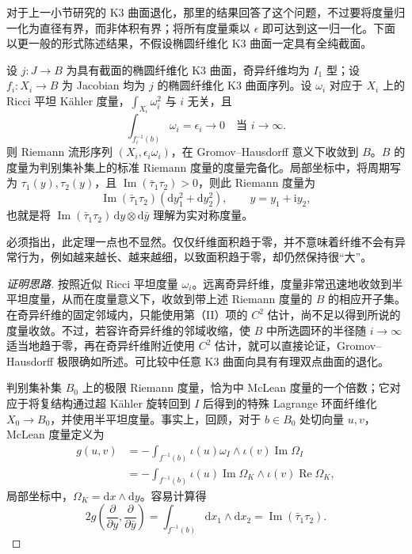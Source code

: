 对于上一小节研究的 K3 曲面退化，那里的结果回答了这个问题，不过要将度量归一化为直径有界，而非体积有界；将所有度量乘以 $\epsilon$ 即可达到这一归一化。下面以更一般的形式陈述结果，不假设椭圆纤维化 K3 曲面一定具有全纯截面。

\begin{theorem}\label{thm:7.31}
设 $j\colon J\to B$ 为具有截面的椭圆纤维化 K3 曲面，奇异纤维均为 $I_1$ 型；设 $f_i\colon X_i\to B$ 为 Jacobian 均为 $j$ 的椭圆纤维化 K3 曲面序列。设 $\omega_i$ 对应于 $X_i$ 上的 Ricci 平坦 Kähler 度量，$\int_{X_i}\omega_i^2$ 与 $i$ 无关，且
\[
\int_{f_i^{-1}(b)}\omega_i=\epsilon_i\longrightarrow0
\quad\text{当 }i\to\infty.
\]
则 Riemann 流形序列 $(X_i,\epsilon_i\omega_i)$，在 Gromov--Hausdorff 意义下收敛到 $B$。$B$ 的度量为判别集补集上的标准 Riemann 度量的度量完备化。局部坐标中，将周期写为 $\tau_1(y),\tau_2(y)$，且 $\operatorname{Im}(\bar\tau_1\tau_2)>0$，则此 Riemann 度量为
\[
\operatorname{Im}(\bar\tau_1\tau_2)
(\mathrm dy_1^2+\mathrm dy_2^2),\qquad y=y_1+\mathrm i y_2,
\]
也就是将 $\operatorname{Im}(\bar\tau_1\tau_2)\,\mathrm dy\otimes\mathrm d\bar y$ 理解为实对称度量。
\end{theorem}

必须指出，此定理一点也不显然。仅仅纤维面积趋于零，并不意味着纤维不会有异常行为，例如越来越长、越来越细，以致面积趋于零，却仍然保持很“大”。

\begin{proof}[证明思路]
按照近似 Ricci 平坦度量 $\omega_i$。远离奇异纤维，度量非常迅速地收敛到半平坦度量，从而在度量意义下，收敛到带上述 Riemann 度量的 $B$ 的相应开子集。在奇异纤维的固定邻域内，只能使用第（II）项的 $C^2$ 估计，尚不足以得到所说的度量收敛。不过，若容许奇异纤维的邻域收缩，使 $B$ 中所选圆环的半径随 $i\to\infty$ 适当地趋于零，再在奇异纤维附近使用 $C^2$ 估计，就可以直接论证，Gromov--Hausdorff 极限确如所述。可比较中任意 K3 曲面向具有有理双点曲面的退化。

判别集补集 $B_0$ 上的极限 Riemann 度量，恰为中 McLean 度量的一个倍数；它对应于将复结构通过超 Kähler 旋转回到 $I$ 后得到的特殊 Lagrange 环面纤维化 $X_0\to B_0$，并使用半平坦度量。事实上，回顾，对于 $b\in B_0$ 处切向量 $u,v$，McLean 度量定义为
\[
\begin{aligned}
g(u,v)
&=-\int_{f^{-1}(b)}\iota(u)\omega_I\wedge\iota(v)\operatorname{Im}\Omega_I\\
&=-\int_{f^{-1}(b)}\iota(u)\operatorname{Im}\Omega_K
\wedge\iota(v)\operatorname{Re}\Omega_K,
\end{aligned}
\]
局部坐标中，$\Omega_K=\mathrm dx\wedge\mathrm dy$。容易计算得
\[
2g\left(\frac\partial{\partial y},\frac\partial{\partial\bar y}\right)
=\int_{f^{-1}(b)}\mathrm dx_1\wedge\mathrm dx_2
=\operatorname{Im}(\bar\tau_1\tau_2).
\]
\end{proof}


